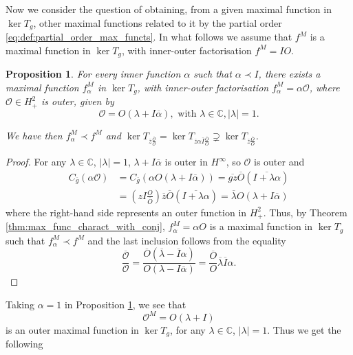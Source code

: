 \documentclass[12pt]{elsarticle}
\numberwithin{equation}{section}
\theoremstyle{plain}
\newtheorem{prop}[thm]{Proposition}
\newcommand{\Hp}{\ensuremath{H^2_+}}
\newcommand{\Hinf}{\ensuremath{H^\infty}}
\newcommand{\CC}{\ensuremath{\mathbb{C}}}
\newcommand{\OO}{\ensuremath{\mathcal{O}}}
\newcommand{\Cg}{\ensuremath{C_{\ol g}}}
\newcommand{\ol}[1]{\ensuremath{\overline{#1}}}
\begin{document}
\vspace{8pt}

Now we consider the question of obtaining, from a given maximal function in $\ker T_g$, other maximal functions related to it by the partial order \eqref{eq:def:partial_order_max_functs}.
In what follows we assume that $f^M$ is a maximal function in $\ker T_g$, with inner-outer factorisation $f^M = I O$.


\begin{prop}
\label{prop:maximal_function_prescribed_inner_factor}
For every inner function $\alpha$ such that $\alpha \prec I$, there exists a maximal function $f_\alpha^M$ in $\ker T_g$, with inner-outer factorisation $f_\alpha^M = \alpha\OO$, where $\OO\in\Hp$ is outer, given by
\begin{equation}
\label{eq:outer_factor_max_func_prescribed_inner_factor}
\OO = O (\lambda + I \ol \alpha ), \text{ with } \lambda \in\CC, |\lambda| = 1.
\end{equation}

We have then $f_\alpha^M \prec f^M$ and $\ker T_{\ol z \frac{\ol\OO}{\OO}} = \ker T_{\ol z \alpha \ol I \frac{\ol O}{O}} \supsetneq \ker T_{\ol z \frac{\ol O}{O}}$.
\end{prop}

\begin{proof}
For any $\lambda \in \CC$, $|\lambda|=1$, $\lambda + I \ol\alpha$ is outer in \Hinf, so $\OO$ is outer and
\begin{align*}
\Cg ( \alpha\OO) &= \Cg \left(\alpha O \left(\lambda + I \ol\alpha\right) \right) = \ol {gz} \ol O \left(\ol{ I + \lambda \alpha}\right) \\
&= \left(z I \frac{O}{\ol O}\right) \ol z \ol O \left(\ol{ I + \lambda \alpha}\right) = \ol\lambda O \left(\lambda + I \ol\alpha\right)
\end{align*}
where the right-hand side represents an outer function in \Hp.
Thus, by Theorem \ref{thm:max_func_charact_with_conj}, $f_\alpha^M = \alpha O$ is a maximal function in $\ker T_g$ such that $f_\alpha^M \prec f^M$ and the last inclusion follows from the equality
\[
\frac{\ol\OO}{\OO} = \frac{\ol O (\ol\lambda - \ol I \alpha)}{O (\lambda - I \ol\alpha)} = \frac{\ol O}{O} \ol\lambda \ol I \alpha.
\]
\end{proof}


Taking $\alpha=1$ in Proposition \ref{prop:maximal_function_prescribed_inner_factor}, we see that
\begin{equation}
\OO^M = O (\lambda + I )
\end{equation}
is an outer maximal function in $\ker T_g$, for any $\lambda\in\CC$, $|\lambda|=1$.
Thus we get the following
\end{document}
